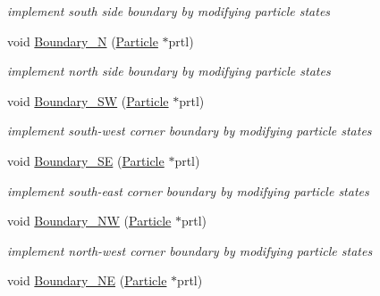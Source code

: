 \begin{CompactItemize}
\begin{CompactList}\small\item\em implement south side boundary by modifying particle states \item\end{CompactList}\item 
\hypertarget{classBoundary_ec89b3e4212c60f0b6a42199a844d032}{
void \hyperlink{classBoundary_ec89b3e4212c60f0b6a42199a844d032}{Boundary\_\-N} (\hyperlink{classParticle}{Particle} $\ast$prtl)}
\label{classBoundary_ec89b3e4212c60f0b6a42199a844d032}

\begin{CompactList}\small\item\em implement north side boundary by modifying particle states \item\end{CompactList}\item 
\hypertarget{classBoundary_5ec3b43fbe487290b3b3c584ffdfbd54}{
void \hyperlink{classBoundary_5ec3b43fbe487290b3b3c584ffdfbd54}{Boundary\_\-SW} (\hyperlink{classParticle}{Particle} $\ast$prtl)}
\label{classBoundary_5ec3b43fbe487290b3b3c584ffdfbd54}

\begin{CompactList}\small\item\em implement south-west corner boundary by modifying particle states \item\end{CompactList}\item 
\hypertarget{classBoundary_8a334d5f6950a17261504751a706ec78}{
void \hyperlink{classBoundary_8a334d5f6950a17261504751a706ec78}{Boundary\_\-SE} (\hyperlink{classParticle}{Particle} $\ast$prtl)}
\label{classBoundary_8a334d5f6950a17261504751a706ec78}

\begin{CompactList}\small\item\em implement south-east corner boundary by modifying particle states \item\end{CompactList}\item 
\hypertarget{classBoundary_75bfad6f3ef080a83ca3c0746f94ca4e}{
void \hyperlink{classBoundary_75bfad6f3ef080a83ca3c0746f94ca4e}{Boundary\_\-NW} (\hyperlink{classParticle}{Particle} $\ast$prtl)}
\label{classBoundary_75bfad6f3ef080a83ca3c0746f94ca4e}

\begin{CompactList}\small\item\em implement north-west corner boundary by modifying particle states \item\end{CompactList}\item 
\hypertarget{classBoundary_7ce0aad430a89265e89b76c79ab09dc9}{
void \hyperlink{classBoundary_7ce0aad430a89265e89b76c79ab09dc9}{Boundary\_\-NE} (\hyperlink{classParticle}{Particle} $\ast$prtl)}
\label{classBoundary_7ce0aad430a89265e89b76c79ab09dc9}


\end{CompactItemize}
